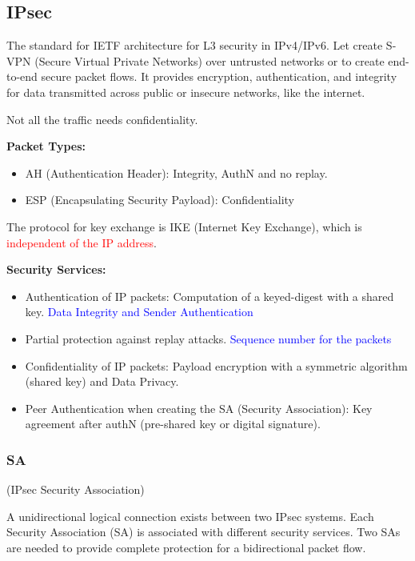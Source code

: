 \hfill
\begin{center}
    \subsection{IPsec}
\end{center}
The standard for IETF architecture for L3 security in IPv4/IPv6. Let create S-VPN (Secure Virtual Private Networks) over untrusted networks or to create end-to-end secure packet flows. It provides encryption, authentication, and integrity for data transmitted across public or insecure networks, like the internet.

\hfill

\begin{tcolorbox}[colback=blue!10!white, colframe=blue!50!white, title=Reminder] 
    Not all the traffic needs confidentiality.
\end{tcolorbox}

\hfill

\textbf{Packet Types:}
\begin{itemize}
    \item AH (Authentication Header): Integrity, AuthN and no replay.
    \item ESP (Encapsulating Security Payload): Confidentiality
\end{itemize}

The protocol for key exchange is IKE (Internet Key Exchange), which is \textcolor{red}{independent of the IP address}.

\hfill 

\textbf{Security Services:}
\begin{itemize}
    \item Authentication of IP packets: Computation of a keyed-digest with a shared key. \textcolor{Blue}{Data Integrity and Sender Authentication}
    \item Partial protection against replay attacks. \textcolor{Blue}{Sequence number for the packets}
    \item Confidentiality of IP packets: Payload encryption with a symmetric algorithm (shared key) and Data Privacy.
    \item Peer Authentication when creating the SA (Security Association): Key agreement after authN (pre-shared key or digital signature).
\end{itemize}

\subsubsection{SA}
\begin{center}
    (IPsec Security Association)
\end{center}
A unidirectional logical connection exists between two IPsec systems. Each Security Association (SA) is associated with different security services. Two SAs are needed to provide complete protection for a bidirectional packet flow.

